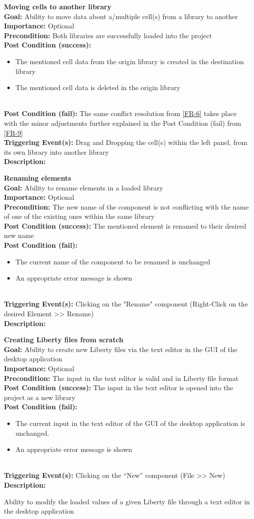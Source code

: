 \documentclass[10pt,a4paper]{report}
\newcommand{\FRDescription}[8]{
    \textbf{#1} \leavevmode \\
    \textbf{Goal: } #2 \leavevmode \\
    \textbf{Importance: } #3 \leavevmode \\
    \textbf{Precondition: } #4 \leavevmode \\
    \textbf{Post Condition (success): } #5 \leavevmode \\
    \textbf{Post Condition (fail): } #6 \leavevmode \\
    \textbf{Triggering Event(s): } #7 \leavevmode \\
    \textbf{Description: } \leavevmode \\ 
    #8}
\newcommand{\FRODescription}[8]{
    \textbf{#1} \leavevmode \\
    \textbf{Goal: } #2 \leavevmode \\
    \textbf{Importance: } #3 \leavevmode \\
    \textbf{Precondition: } #4 \leavevmode \\
    \textbf{Post Condition (success): } #5 \leavevmode \\
    \textbf{Post Condition (fail): } #6 \leavevmode \\
    \textbf{Triggering Event(s): } #7 \leavevmode \\
    \textbf{Description: } \leavevmode \\
    #8}
\begin{document}
\begin{FRO}
    \item \FRDescription{Moving cells to another library}
    {Ability to move data about a/multiple cell(s) from a library to another}
    {Optional}
    {Both libraries are successfully loaded into the project}
    {\begin{itemize}
        \item The mentioned cell data from the origin library is created in the destination library
        \item The mentioned cell data is deleted in the origin library
    \end{itemize}}
    {The same conflict resolution from \ref{FR-6} takes place with the minor adjustments further explained in the Post Condition (fail) from \ref{FR-9}}
    {Drag and Dropping the cell(s) within the left panel, from its own library into another library}
    \item \FRODescription{Renaming elements}
    {Ability to rename elements in a loaded library}
    {Optional}
    {The new name of the component is not conflicting with the name of one of the existing ones within the same library}
    {The mentioned element is renamed to their desired new name}
    {\begin{itemize}
        \item The current name of the component to be renamed is unchanged
        \item An appropriate error message is shown
    \end{itemize}}
    {Clicking on the "Rename" component (Right-Click on the desired Element  >> Rename)}
    \item \FRODescription{Creating Liberty files from scratch}
    {Ability to create new Liberty files via the text editor in the GUI of the desktop application}
    {Optional}
    {The input in the text editor is valid and in Liberty file format}
    {The input in the text editor is opened into the project as a new library}
    {\begin{itemize}
        \item The current input in the text editor of the GUI of the desktop application is unchanged.
        \item An appropriate error message is shown
    \end{itemize}}
    {Clicking on the “New” component (File >> New)}
    \item {}
    {Ability to modify the loaded values of a given Liberty file through a text editor in the desktop application}

\end{FRO}
\end{document}
